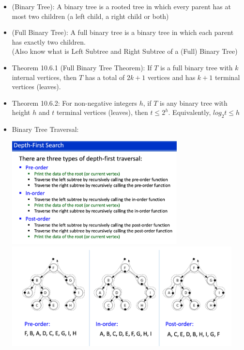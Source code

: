 \documentclass{article}
\begin{document}
\begin{itemize}
    \item (Binary Tree): A binary tree is a rooted tree in which every parent has at most two children (a left child, a right child or both)
    \item (Full Binary Tree): A full binary tree is a binary tree in which each parent has exactly two children. \\(Also know what is Left Subtree and Right Subtree of a (Full) Binary Tree)
    \item Theorem 10.6.1 (Full Binary Tree Theorem): If $T$ is a full binary tree with $k$ internal vertices, then $T$ has a total of $2k+1$ vertices and has $k+1$ terminal vertices (leaves).
    \item Theorem 10.6.2: For non-negative integers $h$, if $T$ is any binary tree with height $h$ and $t$ terminal vertices (leaves), then $t\leqslant 2^h$. Equivalently, $log_2t\leqslant h$
    \pagebreak
    \item Binary Tree Traversal:
        \begin{center}
            \includegraphics[width=9cm]{images/dfs.png}
            \includegraphics[width=12cm]{images/dfs_1.png}

\end{center}
\end{itemize}
\end{document}
